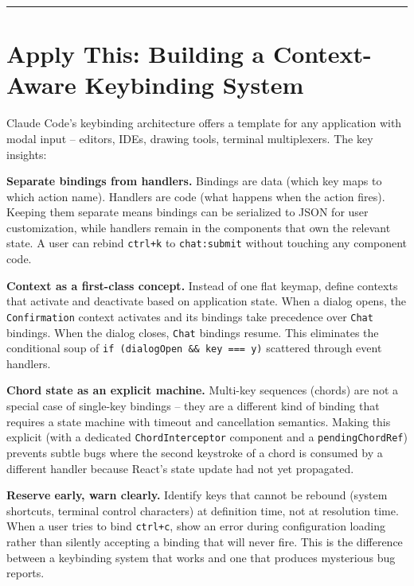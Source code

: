 \documentclass[
  english,
  11pt,
  letterpaper,
]{book}
\begin{document}
\begin{center}\rule{0.5\linewidth}{0.5pt}\end{center}

\section{Apply This: Building a Context-Aware Keybinding
System}\label{apply-this-building-a-context-aware-keybinding-system}

Claude Code's keybinding architecture offers a template for any
application with modal input -- editors, IDEs, drawing tools, terminal
multiplexers. The key insights:

\textbf{Separate bindings from handlers.} Bindings are data (which key
maps to which action name). Handlers are code (what happens when the
action fires). Keeping them separate means bindings can be serialized to
JSON for user customization, while handlers remain in the components
that own the relevant state. A user can rebind \texttt{ctrl+k} to
\texttt{chat:submit} without touching any component code.

\textbf{Context as a first-class concept.} Instead of one flat keymap,
define contexts that activate and deactivate based on application state.
When a dialog opens, the \texttt{Confirmation} context activates and its
bindings take precedence over \texttt{Chat} bindings. When the dialog
closes, \texttt{Chat} bindings resume. This eliminates the conditional
soup of
\texttt{if\ (dialogOpen\ \&\&\ key\ ===\ \textquotesingle{}y\textquotesingle{})}
scattered through event handlers.

\textbf{Chord state as an explicit machine.} Multi-key sequences
(chords) are not a special case of single-key bindings -- they are a
different kind of binding that requires a state machine with timeout and
cancellation semantics. Making this explicit (with a dedicated
\texttt{ChordInterceptor} component and a \texttt{pendingChordRef})
prevents subtle bugs where the second keystroke of a chord is consumed
by a different handler because React's state update had not yet
propagated.

\textbf{Reserve early, warn clearly.} Identify keys that cannot be
rebound (system shortcuts, terminal control characters) at definition
time, not at resolution time. When a user tries to bind \texttt{ctrl+c},
show an error during configuration loading rather than silently
accepting a binding that will never fire. This is the difference between
a keybinding system that works and one that produces mysterious bug
reports.
\end{document}
